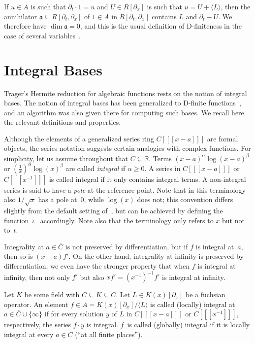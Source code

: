 \documentclass[final,1p,times,authoryear]{elsarticle}
\def\<#1>{\langle#1\rangle}
\let\set\mathbb
\begin{document}
If $u\in A$ is such that $\partial_t\cdot 1 = u$ and $U\in R[\partial_x]$ is such
that $u=U+\<L>$, then the annihilator $\mathfrak{a}\subseteq R[\partial_t,\partial_x]$
of $1\in A$ in $R[\partial_t,\partial_x]$ contains $L$ and $\partial_t-U$. We
therefore have $\dim\mathfrak{a}=0$, and this is the usual
definition of D-finiteness in the case of several variables~\citep{Zeilberger1990,chyzak98,koutschan09,kauers14c}.

\section{Integral Bases}

Trager's Hermite reduction for algebraic functions rests on the notion of
integral bases. The notion of integral bases has been generalized to D-finite
functions~\citep{kauers15b}, and an algorithm was also given there for
computing such bases. We recall here the relevant definitions and properties.

Although the elements of a generalized series ring $C[[[x-a]]]$ are formal
objects, the series notation suggests certain analogies with complex
functions.  For simplicity, let us assume throughout that $C\subseteq\set
R$. Terms $(x-a)^\alpha\log(x-a)^\beta$ or $(\tfrac1x)^\alpha\log(x)^\beta$ are
called \emph{integral} if $\alpha\geq0$. A series in
$C[[[x-a]]]$ or $C[[[x^{-1}]]]$ is called integral if it only contains integral
terms. A non-integral series is said to have a \emph{pole} at the reference
point. Note that in this terminology also $1/\sqrt{x}$ has a pole
at~$0$, while $\log(x)$ does not; this convention differs slightly from the
default setting of~\citep[Ex.~2]{kauers15b}, but can be achieved by defining
the function~$\iota$~\citep[Def.~1]{kauers15b} accordingly. Note also that
the terminology only refers to $x$ but not to~$t$.

Integrality at $a\in\bar C$ is not preserved by differentiation,
but if $f$ is integral at~$a$, then so is $(x-a)f'$. On the other hand,
integrality at infinity is preserved by differentiation; we even have the
stronger property that when $f$ is integral at infinity, then not only $f'$
but also $xf'=(x^{-1})^{-1}f'$ is integral at infinity.

Let $K$ be some field with $C\subseteq K\subseteq\bar C$.
Let $L\in K(x)[\partial_x]$ be a fuchsian operator. An element $f\in A=K(x)[\partial_x]/\<L>$
is called (locally) integral at $a\in\bar C\cup\{\infty\}$ if for every solution $y$
of $L$ in $C[[[x-a]]]$ or $C[[[x^{-1}]]]$, respectively, the series $f\cdot y$ is
integral. $f$~is called (globally) integral if it is locally integral at every
$a\in\bar C$ (``at all finite places'').
\end{document}
